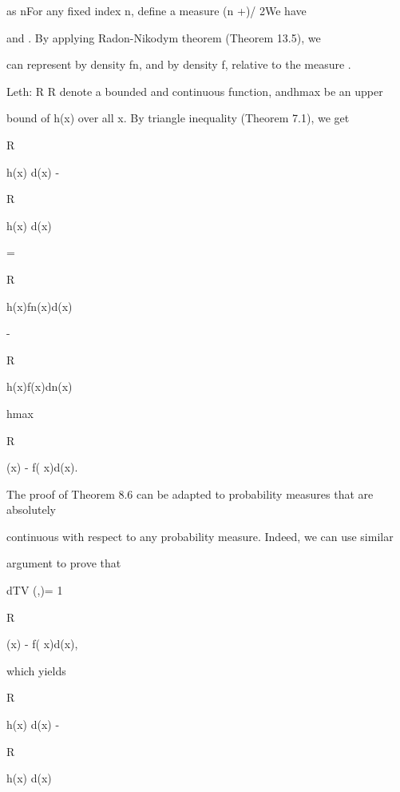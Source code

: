 as n\to\infty For any fixed index n, define a measure \nun \coloneqq(\mu n +\mu)/ 2We have

\mun \ll \nun and \mu\ll \nun. By applying Radon-Nikodym theorem (Theorem 13.5), we

can represent \mun by density fn, and \mu by density f, relative to the measure \nun.

Leth: R \to R denote a bounded and continuous function, andhmax be an upper

bound of h(x) over all x. By triangle inequality (Theorem 7.1), we get

\vert\vert\vert

\int

R

h(x) d\mun(x) -

\int

R

h(x) d\mu(x)

\vert\vert\vert =

\vert\vert\vert

\int

R

h(x)fn(x)d\nun(x)

-

\int

R

h(x)f(x)d\nu n(x)

\vert\vert\vert

\leq hmax

\int

R

\vertfn(x) - f( x)\vert d\nun(x).

The proof of Theorem 8.6 can be adapted to probability measures that are absolutely

continuous with respect to any probability measure. Indeed, we can use similar

argument to prove that

dTV (\mun,\mu )= 1

\int

R

\vertfn(x) - f( x)\vert d\nun(x),

which yields

\vert\vert\vert

\int

R

h(x) d\mun(x) -

\int

R

h(x) d\mu(x)

